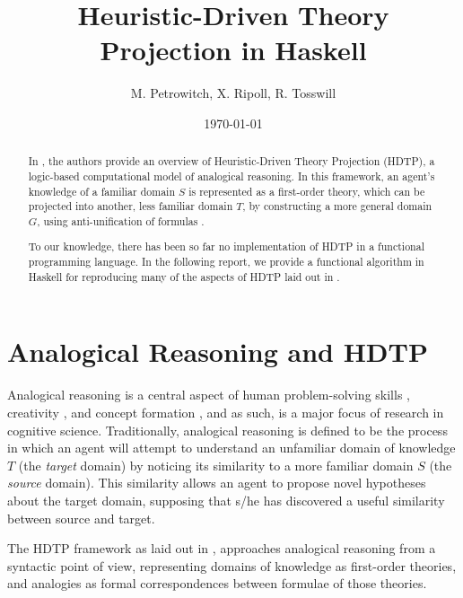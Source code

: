 \documentclass[12pt,a4paper]{article}
\title{Heuristic-Driven Theory Projection in Haskell}
\author{M. Petrowitch, X. Ripoll, R. Tosswill}
\date{\today}
\begin{document}
\maketitle

\begin{abstract}
In \cite{Schmidt-2014}, the authors provide an overview of Heuristic-Driven
Theory Projection (HDTP), a logic-based computational model of analogical
reasoning. In this framework, an agent's knowledge of a familiar domain $S$ is
represented as a first-order theory, which can be projected into another, less
familiar domain $T$, by constructing a more general domain $G$, using
anti-unification of formulas \cite{Plotkin70}. 

To our knowledge, there has been so far no implementation of HDTP in a functional programming language. In the following report, we provide a functional algorithm in Haskell for reproducing many of the aspects of HDTP laid out in \cite{Schmidt-2014}.
\end{abstract}

\vfill

\tableofcontents



\clearpage


\section{Analogical Reasoning and HDTP}
Analogical reasoning is a central aspect of human problem-solving skills
\cite{gentner}, creativity \cite{Besold2015GeneralizeAB}, and concept
formation \cite{hofstadter2013surfaces}, and as such, is a major focus of
research in cognitive science. Traditionally, analogical reasoning is defined to be the process in which an agent will attempt to understand an unfamiliar domain of knowledge $T$ (the \textit{target} domain) by noticing its similarity to a more familiar domain $S$ (the \textit{source} domain). This similarity allows an agent to propose novel hypotheses about the target domain, supposing that s/he has discovered a useful similarity between source and target.

The HDTP framework as laid out in \cite{Schmidt-2014}, approaches analogical reasoning from a syntactic point of view, representing domains of knowledge as first-order theories, and analogies as formal correspondences between formulae of those theories. 
\end{document}
